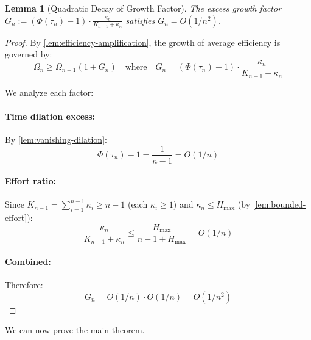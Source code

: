 \documentclass[11pt]{article}
\newtheorem{lemma}[theorem]{Lemma}
\theoremstyle{definition}
\theoremstyle{remark}
\begin{document}
\begin{lemma}[Quadratic Decay of Growth Factor]
\label{lem:quadratic-decay}
The excess growth factor $G_n := (\Phi(\tau_n) - 1) \cdot \frac{\kappa_n}{K_{n-1} + \kappa_n}$ satisfies $G_n = O(1/n^2)$.
\end{lemma}

\begin{proof}
By \cref{lem:efficiency-amplification}, the growth of average efficiency is governed by:
\[
\Omega_n \geq \Omega_{n-1}(1 + G_n) \quad \text{where} \quad G_n = (\Phi(\tau_n) - 1) \cdot \frac{\kappa_n}{K_{n-1} + \kappa_n}
\]

We analyze each factor:

\paragraph{Time dilation excess:} By \cref{lem:vanishing-dilation}:
\[
\Phi(\tau_n) - 1 = \frac{1}{n-1} = O(1/n)
\]

\paragraph{Effort ratio:} Since $K_{n-1} = \sum_{i=1}^{n-1} \kappa_i \geq n-1$ (each $\kappa_i \geq 1$) and $\kappa_n \leq H_{\max}$ (by \cref{lem:bounded-effort}):
\[
\frac{\kappa_n}{K_{n-1} + \kappa_n} \leq \frac{H_{\max}}{n-1 + H_{\max}} = O(1/n)
\]

\paragraph{Combined:} Therefore:
\[
G_n = O(1/n) \cdot O(1/n) = O(1/n^2)
\]
\end{proof}

We can now prove the main theorem.
\end{document}
